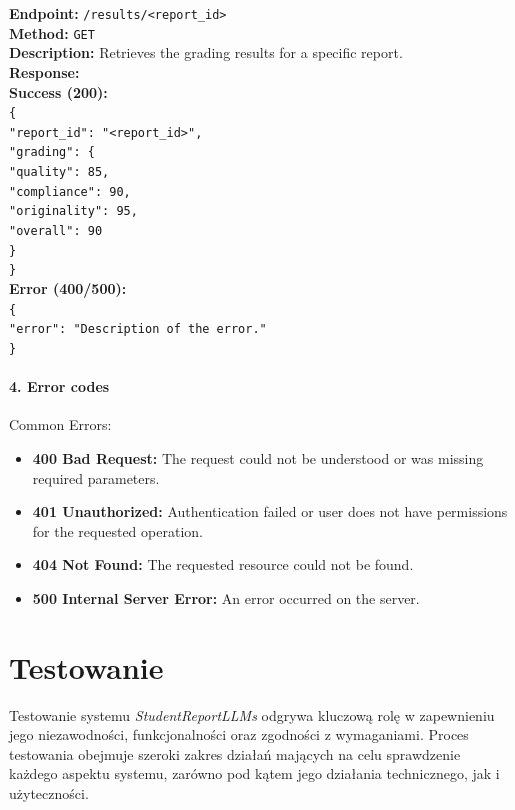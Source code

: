 \documentclass[a4paper, 12pt]{article}
\begin{document}
\begin{tabbing}
\textbf{Endpoint:} \= \texttt{/results/<report\_id>} \\
\textbf{Method:} \> \texttt{GET} \\
\textbf{Description:} \> Retrieves the grading results for a specific report. \\
\textbf{Response:} \\
\> \textbf{Success (200):} \\
\> \> \texttt{\{ \\
\> \> \> "report\_id": "<report\_id>", \\
\> \> \> "grading": \{ \\
\> \> \> \> "quality": 85, \\
\> \> \> \> "compliance": 90, \\
\> \> \> \> "originality": 95, \\
\> \> \> \> "overall": 90 \\
\> \> \> \} \\
\> \> \}} \\
\> \textbf{Error (400/500):} \\
\> \> \texttt{\{ \\
\> \> \> "error": "Description of the error." \\
\> \> \}}
\end{tabbing}

\paragraph{4. Error codes}

Common Errors:
\begin{itemize}
\item \textbf{400 Bad Request:} The request could not be understood or was missing required parameters.
\item \textbf{401 Unauthorized:} Authentication failed or user does not have permissions for the requested operation.
\item \textbf{404 Not Found:} The requested resource could not be found.
\item \textbf{500 Internal Server Error:} An error occurred on the server.
\end{itemize}

\newpage
\section{Testowanie}
Testowanie systemu \textit{StudentReportLLMs} odgrywa kluczową rolę w zapewnieniu jego niezawodności, funkcjonalności oraz zgodności z wymaganiami. Proces testowania obejmuje szeroki zakres działań mających na celu sprawdzenie każdego aspektu systemu, zarówno pod kątem jego działania technicznego, jak i użyteczności.
\end{document}

